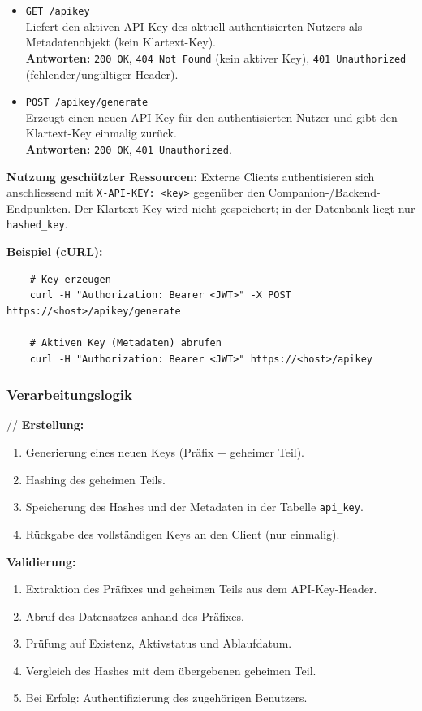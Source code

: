 \documentclass[12pt,a4paper]{report}
\begin{document}
    \begin{itemize}
      \item \texttt{GET /apikey} \\
            Liefert den aktiven API-Key des aktuell authentisierten Nutzers als Metadatenobjekt (kein Klartext-Key). \\
            \textbf{Antworten:} \texttt{200 OK}, \texttt{404 Not Found} (kein aktiver Key), \texttt{401 Unauthorized} (fehlender/ungültiger Header).
      \item \texttt{POST /apikey/generate} \\
            Erzeugt einen neuen API-Key für den authentisierten Nutzer und gibt den Klartext-Key einmalig zurück. \\
            \textbf{Antworten:} \texttt{200 OK}, \texttt{401 Unauthorized}.
    \end{itemize}

    \noindent
    \textbf{Nutzung geschützter Ressourcen:} Externe Clients authentisieren sich anschliessend mit \texttt{X-API-KEY: <key>} gegenüber den Companion-/Backend-Endpunkten. Der Klartext-Key wird nicht gespeichert; in der Datenbank liegt nur \texttt{hashed\_key}.

    \noindent
    \textbf{Beispiel (cURL):}
    \begin{verbatim}
    # Key erzeugen
    curl -H "Authorization: Bearer <JWT>" -X POST https://<host>/apikey/generate

    # Aktiven Key (Metadaten) abrufen
    curl -H "Authorization: Bearer <JWT>" https://<host>/apikey
    \end{verbatim}

    \subsubsection{Verarbeitungslogik}//
    \textbf{Erstellung:}
    \begin{enumerate}
      \item Generierung eines neuen Keys (Präfix + geheimer Teil).
      \item Hashing des geheimen Teils.
      \item Speicherung des Hashes und der Metadaten in der Tabelle \texttt{api\_key}.
      \item Rückgabe des vollständigen Keys an den Client (nur einmalig).
    \end{enumerate}
    \textbf{Validierung:}
    \begin{enumerate}
      \item Extraktion des Präfixes und geheimen Teils aus dem API-Key-Header.
      \item Abruf des Datensatzes anhand des Präfixes.
      \item Prüfung auf Existenz, Aktivstatus und Ablaufdatum.
      \item Vergleich des Hashes mit dem übergebenen geheimen Teil.
      \item Bei Erfolg: Authentifizierung des zugehörigen Benutzers.
    \end{enumerate}
\end{document}

